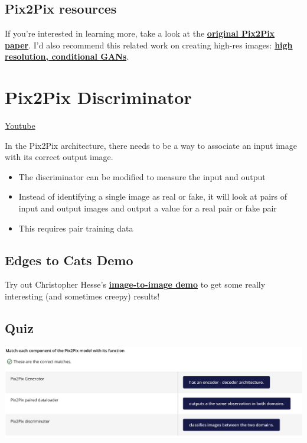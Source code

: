 \subsection{Pix2Pix resources}
If you're interested in learning more, take a look at the \href{https://arxiv.org/pdf/1611.07004.pdf}{\textbf{original Pix2Pix paper}}. I'd also recommend this related work on creating high-res images: \href{https://tcwang0509.github.io/pix2pixHD/}{\textbf{high resolution, conditional GANs}}.

\section{Pix2Pix Discriminator}
\href{https://www.youtube.com/watch?v=3Khqf7WtCxY}{Youtube} \newline

In the Pix2Pix architecture, there needs to be a way to associate an input image with its correct output image.
\begin{itemize}
    \item The discriminator can be modified to measure the input and output
    \item Instead of identifying a single image as real or fake, it will look at pairs of input and output images and output a value for a real pair or fake pair
    \item This requires pair training data
\end{itemize}
\subsection{Edges to Cats Demo}
Try out Christopher Hesse's \href{https://affinelayer.com/pixsrv/}{\textbf{image-to-image demo}} to get some really interesting (and sometimes creepy) results!

\subsection{Quiz}

\includegraphics[width=1\linewidth]{img//genAdvNet//image2image/quiz1e.png}

